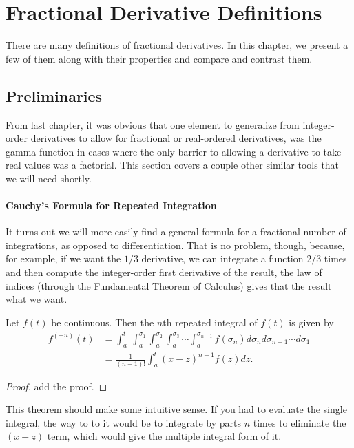 \chapter{Fractional Derivative Definitions}

There are many definitions of fractional derivatives. In this chapter, we present a few of them along with their properties and compare and contrast them.

\section{Preliminaries}

From last chapter, it was obvious that one element to generalize from integer-order derivatives to allow for fractional or real-ordered derivatives, was the gamma function in cases where the only barrier to allowing a derivative to take real values was a factorial. This section covers a couple other similar tools that we will need shortly.

\subsubsection{Cauchy's Formula for Repeated Integration}

It turns out we will more easily find a general formula for a fractional number of integrations, as opposed to differentiation. That is no problem, though, because, for example, if we want the $1/3$ derivative, we can integrate a function $2/3$ times and then compute the integer-order first derivative of the result, the law of indices (through the Fundamental Theorem of Calculus) gives that the result what we want. 

\begin{theorem}
  Let $f(t)$ be continuous. Then the $n$th repeated integral of $f(t)$ is given by
  \begin{align}
   f^{(-n)}(t) &= \int_a^{t}  \ \int_a^{\sigma_1}  \int_a^{\sigma_2}  \int_a^{\sigma_3} \cdots \int_a^{\sigma_{n-1}} f(\sigma_n) d \sigma_n d \sigma_{n-1} \cdots d \sigma_1 \nonumber  \\
   &= \frac{1}{\left( n - 1 \right)!} \int_a^t \left( x - z \right)^{n-1} f(z) dz.
    \label{eq:cauchy}
  \end{align}
 \label{th:cauchy}
\end{theorem}
\begin{proof}
add the proof.
\end{proof}

This theorem should make some intuitive sense. If you had to evaluate the single integral, the way to to it would be to integrate by parts $n$ times to eliminate the $(x - z)$ term, which would give the multiple integral form of it.

